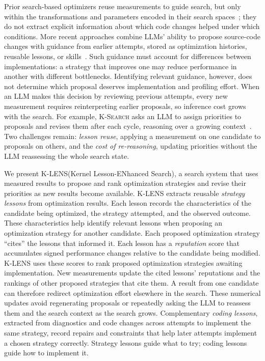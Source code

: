 \documentclass[acmsmall,screen,review,anonymous,nonacm]{acmart}
\newcommand{\klens}{\textsc{K-LENS}\xspace}
\newcommand{\ksearch}{\textsc{K-Search}\xspace}
\begin{document}
Prior search-based optimizers reuse measurements to guide search, but only
within the transformations and parameters encoded in their search
spaces~\citep{Adams2019Halide,Zheng2020Ansor,Ansel2014OpenTuner}; they do not
extract explicit information about which code changes helped under which
conditions. More recent approaches combine LLMs' ability to propose
source-code changes with guidance from earlier attempts, stored as
optimization histories, reusable lessons, or
skills~\citep{Liu2025Lessons,Dong2026KernelBlaster,Sun2026KernelSkill}. Such
guidance must account for differences between implementations: a strategy that
improves one may reduce performance in another with different bottlenecks.
Identifying relevant guidance, however, does not determine which proposal
deserves implementation and profiling effort. When an LLM makes this decision
by reviewing previous attempts, every new measurement requires reinterpreting
earlier proposals, so inference cost grows with the search. For example,
\ksearch asks an LLM to assign priorities to proposals and revises them after
each cycle, reasoning over a growing
context~\citep{Cao2026K}. Two challenges remain: \emph{lesson reuse},
applying a measurement on one candidate to proposals on others, and the
\emph{cost of re-reasoning}, updating priorities without the LLM reassessing
the whole search state.

We present \klens (Kernel Lesson-ENhanced Search), a search system that uses
measured results to propose and rank optimization strategies and revise their
priorities as new results become available. \klens extracts reusable
\emph{strategy lessons} from optimization results. Each lesson records the
characteristics of the candidate being optimized, the strategy attempted, and
the observed outcome. These characteristics help identify relevant lessons
when proposing an optimization strategy for another candidate. Each proposed
optimization strategy ``cites'' the lessons that informed it. Each lesson has
a \emph{reputation} score that accumulates signed performance changes relative
to the candidate being modified. \klens uses these scores to rank proposed
optimization strategies awaiting implementation. New measurements update the
cited lessons' reputations and the rankings of other proposed strategies that
cite them. A result from one candidate can therefore redirect optimization
effort elsewhere in the search. These numerical updates avoid regenerating
proposals or repeatedly asking the LLM to reassess them and the search context
as the search grows. Complementary \emph{coding lessons}, extracted from
diagnostics and code changes across attempts to implement the same strategy, record repairs and
constraints that help later attempts implement a chosen strategy correctly.
Strategy lessons guide what to try; coding lessons guide how to implement it.
\end{document}
